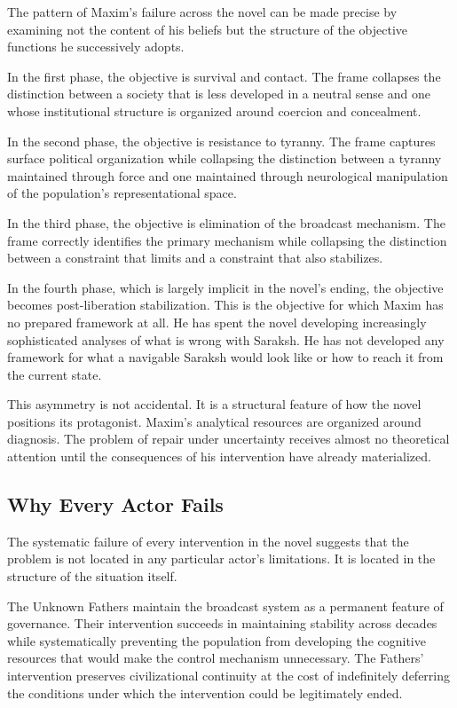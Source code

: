 \documentclass[12pt, a4paper]{article}
\theoremstyle{plain}
\theoremstyle{definition}
\theoremstyle{remark}
\begin{document}
The pattern of Maxim's failure across the novel
can be made precise by examining not the content
of his beliefs but the structure of the objective
functions he successively adopts.

In the first phase, the objective is survival and
contact. The frame collapses the distinction
between a society that is less developed in a
neutral sense and one whose institutional structure
is organized around coercion and concealment.

In the second phase, the objective is resistance
to tyranny. The frame captures surface political
organization while collapsing the distinction
between a tyranny maintained through force and
one maintained through neurological manipulation
of the population's representational space.

In the third phase, the objective is elimination
of the broadcast mechanism. The frame correctly
identifies the primary mechanism while collapsing
the distinction between a constraint that limits
and a constraint that also stabilizes.

In the fourth phase, which is largely implicit
in the novel's ending, the objective becomes
post-liberation stabilization. This is the
objective for which Maxim has no prepared
framework at all. He has spent the novel
developing increasingly sophisticated analyses
of what is wrong with Saraksh. He has not
developed any framework for what a navigable
Saraksh would look like or how to reach it from
the current state.

This asymmetry is not accidental. It is a
structural feature of how the novel positions
its protagonist. Maxim's analytical resources
are organized around diagnosis. The problem of
repair under uncertainty receives almost no
theoretical attention until the consequences
of his intervention have already materialized.

\subsection{Why Every Actor Fails}

The systematic failure of every intervention in
the novel suggests that the problem is not located
in any particular actor's limitations. It is
located in the structure of the situation itself.

The Unknown Fathers maintain the broadcast system
as a permanent feature of governance. Their
intervention succeeds in maintaining stability
across decades while systematically preventing
the population from developing the cognitive
resources that would make the control mechanism
unnecessary. The Fathers' intervention preserves
civilizational continuity at the cost of
indefinitely deferring the conditions under which
the intervention could be legitimately ended.
\end{document}
